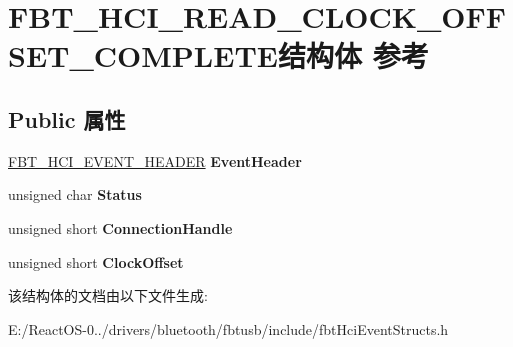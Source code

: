 \hypertarget{struct_f_b_t___h_c_i___r_e_a_d___c_l_o_c_k___o_f_f_s_e_t___c_o_m_p_l_e_t_e}{}\section{F\+B\+T\+\_\+\+H\+C\+I\+\_\+\+R\+E\+A\+D\+\_\+\+C\+L\+O\+C\+K\+\_\+\+O\+F\+F\+S\+E\+T\+\_\+\+C\+O\+M\+P\+L\+E\+T\+E结构体 参考}
\label{struct_f_b_t___h_c_i___r_e_a_d___c_l_o_c_k___o_f_f_s_e_t___c_o_m_p_l_e_t_e}
\subsection*{Public 属性}
\begin{DoxyCompactItemize}
\item 
\mbox{\label{struct_f_b_t___h_c_i___r_e_a_d___c_l_o_c_k___o_f_f_s_e_t___c_o_m_p_l_e_t_e_a2c6e960d96b21b26c5fc8451fec5ab77}} 
\hyperlink{struct_f_b_t___h_c_i___e_v_e_n_t___h_e_a_d_e_r}{F\+B\+T\+\_\+\+H\+C\+I\+\_\+\+E\+V\+E\+N\+T\+\_\+\+H\+E\+A\+D\+ER} {\bfseries Event\+Header}
\item 
\mbox{\label{struct_f_b_t___h_c_i___r_e_a_d___c_l_o_c_k___o_f_f_s_e_t___c_o_m_p_l_e_t_e_a95d6e16be2908fb74de1c01e6b521071}} 
unsigned char {\bfseries Status}
\item 
\mbox{\label{struct_f_b_t___h_c_i___r_e_a_d___c_l_o_c_k___o_f_f_s_e_t___c_o_m_p_l_e_t_e_a0097f1409a052a336c98a33d0089bb01}} 
unsigned short {\bfseries Connection\+Handle}
\item 
\mbox{\label{struct_f_b_t___h_c_i___r_e_a_d___c_l_o_c_k___o_f_f_s_e_t___c_o_m_p_l_e_t_e_a591efecdc9f5b90d2961424e67bdfae7}} 
unsigned short {\bfseries Clock\+Offset}
\end{DoxyCompactItemize}


该结构体的文档由以下文件生成\+:\begin{DoxyCompactItemize}
\item 
E\+:/\+React\+O\+S-\/0../drivers/bluetooth/fbtusb/include/fbt\+Hci\+Event\+Structs.\+h\end{DoxyCompactItemize}

